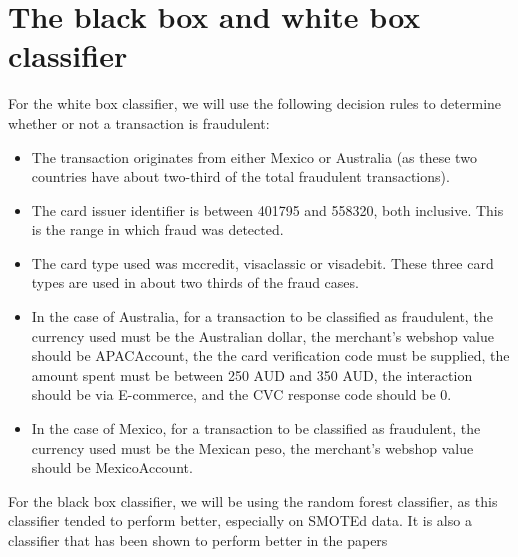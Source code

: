 \documentclass[]{article}
\begin{document}
\section{The black box and white box classifier}
For the white box classifier, we will use the following decision rules to determine whether or not a transaction is fraudulent:
\begin{itemize}
	\item The transaction originates from either Mexico or Australia (as these two countries have about two-third of the total fraudulent transactions).
	\item The card issuer identifier is between 401795 and 558320, both inclusive. This is the range in which fraud was detected.
	\item The card type used was mccredit, visaclassic or visadebit. These three card types are used in about two thirds of the fraud cases.
	\item In the case of Australia, for a transaction to be classified as fraudulent, the currency used must be the Australian dollar, the merchant's webshop value should be APACAccount, the the card verification code must be supplied, the amount spent must be between 250 AUD and 350 AUD, the interaction should be via E-commerce, and the CVC response code should be 0.
	\item In the case of Mexico, for a transaction to be classified as fraudulent, the currency used must be the Mexican peso, the merchant's webshop value should be MexicoAccount.
\end{itemize}
For the black box classifier, we will be using the random forest classifier, as this classifier tended to perform better, especially on SMOTEd data. It is also a classifier that has been shown to perform better in the papers
\end{document}
